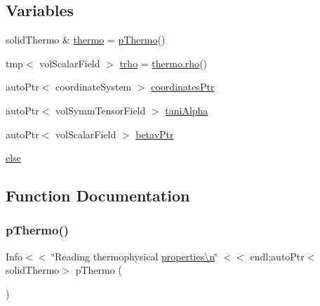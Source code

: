 \subsection*{Variables}
\begin{DoxyCompactItemize}
\item 
solid\+Thermo \& \hyperlink{FMU4FOAM_2application_2solver_2solidFoamAdjustTime_2createFields_8H_a00c34cbdcebe1fe82435a64ddee22a3b}{thermo} = \hyperlink{FMU4FOAM_2application_2solver_2solidFoamAdjustTime_2createFields_8H_add12555826200b51edddb1a224af2dea}{p\+Thermo}()
\item 
tmp$<$ vol\+Scalar\+Field $>$ \hyperlink{FMU4FOAM_2application_2solver_2solidFoamAdjustTime_2createFields_8H_a1900a6d4ca2a9f556fdda6733816e355}{trho} = \hyperlink{EEqn__1pl_8H_ac955f87ac2b79f02f420cae087fc52b1}{thermo.\+rho}()
\item 
auto\+Ptr$<$ coordinate\+System $>$ \hyperlink{FMU4FOAM_2application_2solver_2solidFoamAdjustTime_2createFields_8H_ab2c854728ba05db2aadca4cfcd25084b}{coordinates\+Ptr}
\item 
auto\+Ptr$<$ vol\+Symm\+Tensor\+Field $>$ \hyperlink{FMU4FOAM_2application_2solver_2solidFoamAdjustTime_2createFields_8H_a5702c5e6ab8ba57a6963000e28d63759}{tani\+Alpha}
\item 
auto\+Ptr$<$ vol\+Scalar\+Field $>$ \hyperlink{FMU4FOAM_2application_2solver_2solidFoamAdjustTime_2createFields_8H_a844785a2088bf2e5befbb423d1e57112}{betav\+Ptr}
\item 
\hyperlink{FMU4FOAM_2application_2solver_2solidFoamAdjustTime_2createFields_8H_a0544c3fe466e421738dae463968b70ba}{else}
\end{DoxyCompactItemize}


\subsection{Function Documentation}
\mbox{\label{FMU4FOAM_2application_2solver_2solidFoamAdjustTime_2createFields_8H_add12555826200b51edddb1a224af2dea}} 
\subsubsection{\texorpdfstring{p\+Thermo()}{pThermo()}}
{\footnotesize\ttfamily Info$<$$<$ \char`\"{}Reading thermophysical \hyperlink{solvePointKinetics_8H_adb283ac99a91b10be7420fca0134b932}{properties\textbackslash{}n}\char`\"{} $<$$<$ endl;auto\+Ptr$<$solid\+Thermo$>$ p\+Thermo (\begin{DoxyParamCaption}\item[{solid\+Thermo\+::\+New(\hyperlink{createMeshesPostProcess_8H_a8bb1e58291d2d2b653e024a4f4bffe38}{mesh})}]{ }\end{DoxyParamCaption})}

